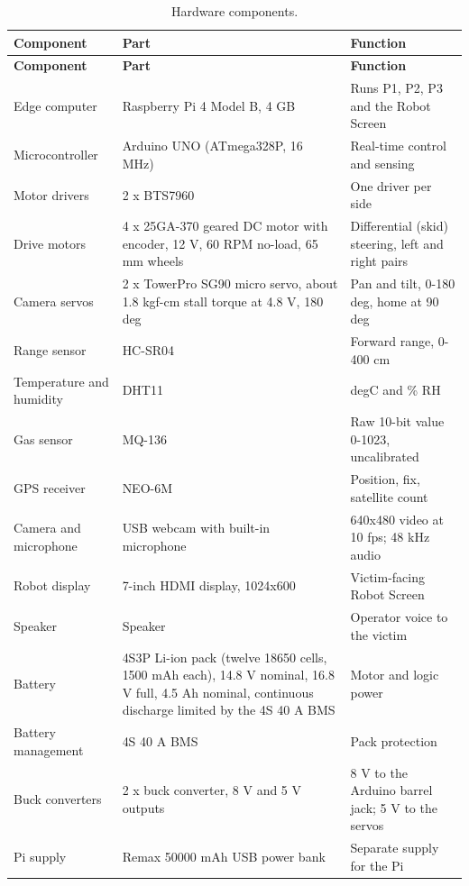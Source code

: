 \begin{center}
\begin{longtable}{|p{3.5cm}|p{4.5cm}|p{5.5cm}|}
\caption{Hardware components.}
\label{tab:hardware-components} \\
\hline
\textbf{Component} & \textbf{Part} & \textbf{Function} \\
\hline
\endfirsthead
\hline
\textbf{Component} & \textbf{Part} & \textbf{Function} \\
\hline
\endhead
Edge computer & Raspberry Pi 4 Model B, 4 GB & Runs P1, P2, P3 and the Robot Screen \\
\hline
Microcontroller & Arduino UNO (ATmega328P, 16 MHz) & Real-time control and sensing \\
\hline
Motor drivers & 2 x BTS7960 & One driver per side \\
\hline
Drive motors & 4 x 25GA-370 geared DC motor with encoder, 12 V, 60 RPM no-load, 65 mm wheels & Differential (skid) steering, left and right pairs \\
\hline
Camera servos & 2 x TowerPro SG90 micro servo, about 1.8 kgf-cm stall torque at 4.8 V, 180 deg & Pan and tilt, 0-180 deg, home at 90 deg \\
\hline
Range sensor & HC-SR04 & Forward range, 0-400 cm \\
\hline
Temperature and humidity & DHT11 & degC and \% RH \\
\hline
Gas sensor & MQ-136 & Raw 10-bit value 0-1023, uncalibrated \\
\hline
GPS receiver & NEO-6M & Position, fix, satellite count \\
\hline
Camera and microphone & USB webcam with built-in microphone & 640x480 video at 10 fps; 48 kHz audio \\
\hline
Robot display & 7-inch HDMI display, 1024x600 & Victim-facing Robot Screen \\
\hline
Speaker & Speaker & Operator voice to the victim \\
\hline
Battery & 4S3P Li-ion pack (twelve 18650 cells, 1500 mAh each), 14.8 V nominal, 16.8 V full, 4.5 Ah nominal, continuous discharge limited by the 4S 40 A BMS & Motor and logic power \\
\hline
Battery management & 4S 40 A BMS & Pack protection \\
\hline
Buck converters & 2 x buck converter, 8 V and 5 V outputs & 8 V to the Arduino barrel jack; 5 V to the servos \\
\hline
Pi supply & Remax 50000 mAh USB power bank & Separate supply for the Pi \\
\hline
\end{longtable}
\end{center}

